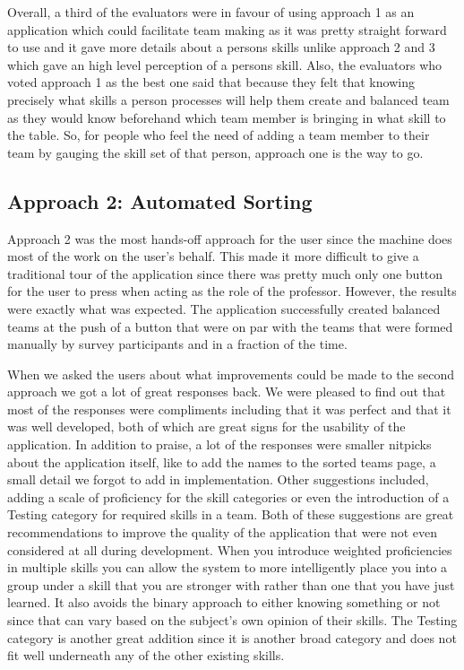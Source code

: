 \documentclass[conference]{IEEEtran}
\begin{document}
Overall, a third of the evaluators were in favour of using approach 1 as an application which could facilitate team making as it was pretty straight forward to use and it gave more details about a persons skills unlike approach 2 and 3 which gave an high level perception of a persons skill. Also, the evaluators who voted approach 1 as the best one said that because they felt that knowing precisely what skills a person processes will help them create and balanced team as they would know beforehand which team member is bringing in what skill to the table. So, for people who feel the need of adding a team member to their team by gauging the skill set of that person, approach one is the way to go. 

\subsection{Approach 2: Automated Sorting}
Approach 2 was the most hands-off approach for the user since the machine does most of the work on the user's behalf. This made it more difficult to give a traditional tour of the application since there was pretty much only one button for the user to press when acting as the role of the professor. However, the results were exactly what was expected. The application successfully created balanced teams at the push of a button that were on par with the teams that were formed manually by survey participants and in a fraction of the time. 

When we asked the users about what improvements could be made to the second approach we got a lot of great responses back. We were pleased to find out that most of the responses were compliments including that it was perfect and that it was well developed, both of which are great signs for the usability of the application. In addition to praise, a lot of the responses were smaller nitpicks about the application itself, like to add the names to the sorted teams page, a small detail we forgot to add in implementation. Other suggestions included, adding a scale of proficiency for the skill categories or even the introduction of a Testing category for required skills in a team. Both of these suggestions are great recommendations to improve the quality of the application that were not even considered at all during development. When you introduce weighted proficiencies in multiple skills you can allow the system to more intelligently place you into a group under a skill that you are stronger with rather than one that you have just learned. It also avoids the binary approach to either knowing something or not since that can vary based on the subject's own opinion of their skills. The Testing category is another great addition since it is another broad category and does not fit well underneath any of the other existing skills. 
\end{document}
